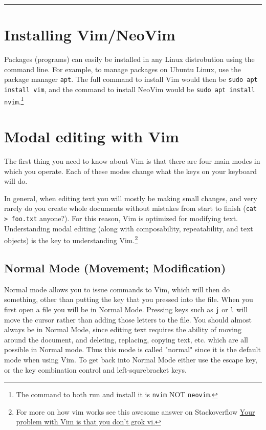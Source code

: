 \documentclass[11pt]{article}
\begin{document}
\noindent\rule{\textwidth}{0.5pt}

\newpage

\section{Installing Vim/NeoVim}
\label{sec:orge1b57e0}
Packages (programs) can easily be installed in any Linux distrobution using the
command line. For example, to manage packages on Ubuntu Linux, use the package
manager \texttt{apt}. The full command to install Vim would then be \texttt{sudo apt install
vim}, and the command to install NeoVim would be \texttt{sudo apt install nvim}.\footnote{The command to both run and install it is \texttt{nvim} NOT \texttt{neovim}.}
\section{Modal editing with Vim}
\label{sec:orge673d57}
The first thing you need to know about Vim is that there are four main modes in
which you operate. Each of these modes change what the keys on your keyboard
will do.

In general, when editing text you will mostly be making small changes, and very
rarely do you create whole documents without mistakes from start to finish (\texttt{cat
> foo.txt} anyone?). For this reason, Vim is optimized for modifying text.
Understanding modal editing (along with composability, repeatability, and text
objects) is the key to understanding Vim.\footnote{For more on how vim works see this awesome answer on Stackoverflow
\href{https://stackoverflow.com/questions/1218390/what-is-your-most-productive-shortcut-with-vim}{Your problem with Vim is that you don't grok vi.}}
\subsection{Normal Mode (Movement; Modification)}
\label{sec:orgd32e782}
Normal mode allows you to issue commands to Vim, which will then do something,
other than putting the key that you pressed into the file. When you first open a
file you will be in Normal Mode. Pressing keys such as \texttt{j} or \texttt{l} will move the
cursor rather than adding those letters to the file. You should almost always be
in Normal Mode, since editing text requires the ability of moving around the
document, and deleting, replacing, copying text, etc. which are all possible in
Normal mode. Thus this mode is called "normal" since it is the default mode when
using Vim. To get back into Normal Mode either use the escape key, or the key
combination control and left-squrebracket keys.
\end{document}
